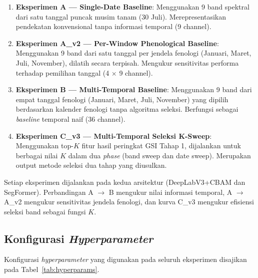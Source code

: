 \begin{enumerate}
    \item \textbf{Eksperimen A — Single-Date Baseline}: Menggunakan 9 band spektral dari satu tanggal puncak musim tanam (30 Juli). Merepresentasikan pendekatan konvensional tanpa informasi temporal (9 channel).

    \item \textbf{Eksperimen A\_v2 — Per-Window Phenological Baseline}: Menggunakan 9 band dari satu tanggal per jendela fenologi (Januari, Maret, Juli, November), dilatih secara terpisah. Mengukur sensitivitas performa terhadap pemilihan tanggal (4 $\times$ 9 channel).

    \item \textbf{Eksperimen B — Multi-Temporal Baseline}: Menggunakan 9 band dari empat tanggal fenologi (Januari, Maret, Juli, November) yang dipilih berdasarkan kalender fenologi tanpa algoritma seleksi. Berfungsi sebagai \textit{baseline} temporal naif (36 channel).

    \item \textbf{Eksperimen C\_v3 — Multi-Temporal Seleksi K-Sweep}: Menggunakan top-$K$ fitur hasil peringkat GSI Tahap 1, dijalankan untuk berbagai nilai $K$ dalam dua \textit{phase} (band sweep dan date sweep). Merupakan output metode seleksi dua tahap yang diusulkan.
\end{enumerate}

Setiap eksperimen dijalankan pada kedua arsitektur (DeepLabV3+CBAM dan SegFormer).
Perbandingan A $\to$ B mengukur nilai informasi temporal, A $\to$ A\_v2 mengukur sensitivitas jendela fenologi, dan kurva C\_v3 mengukur efisiensi seleksi band sebagai fungsi $K$.

\subsection{Konfigurasi \textit{Hyperparameter}}

Konfigurasi \textit{hyperparameter} yang digunakan pada seluruh eksperimen disajikan pada Tabel~\ref{tab:hyperparams}.


